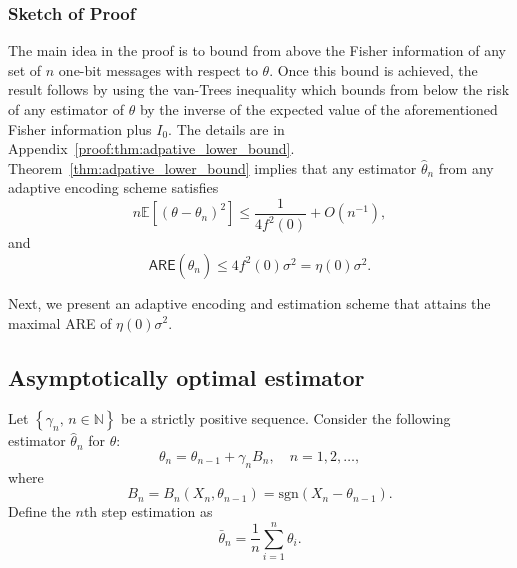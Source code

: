 \documentclass[letterpaper, 11pt]{IEEEtran}      %
\newcommand{\ARE}{\mathsf{ARE}}
\newcommand{\sgn}{\mathrm{sgn} }
\begin{document}
\subsubsection*{Sketch of Proof}
The main idea in the proof is to bound from above the Fisher information of any set of $n$ one-bit messages with respect to $\theta$. Once this bound is achieved, the result follows by using the van-Trees inequality which bounds from below the risk of any estimator of $\theta$ by the inverse of the expected value of the aforementioned Fisher information plus $I_0$. The details are in Appendix~\ref{proof:thm:adpative_lower_bound}.\\

Theorem~\ref{thm:adpative_lower_bound} implies that any estimator $\hat{\theta}_n$ from any adaptive encoding scheme satisfies
\[
n\mathbb E\left[ (\theta-\theta_n)^2 \right] \leq  \frac{1}{4f^2(0)}+O(n^{-1}),
\]
and 
\[
\ARE(\hat{\theta}_n) \leq 4f^2(0)\sigma^2 = \eta(0)\sigma^2.
\]

Next, we present an adaptive encoding and estimation scheme that attains the maximal ARE of $\eta(0)\sigma^2$. 

\subsection{Asymptotically optimal estimator}
Let $\left\{ \gamma_n,\, n\in \mathbb N \right\}$ be a strictly positive sequence. Consider the following estimator $\hat{\theta}_n$ for $\theta$:  
\begin{equation}
\label{eq:sgd_alg}
\theta_n = \theta_{n-1} +  \gamma_n B_n, \quad n = 1,2,\ldots,
\end{equation}
where 
\begin{equation}
B_n = B_n (X_n,\theta_{n-1}) =\sgn (X_n - \theta_{n-1}).
\end{equation}
Define the $n$th step estimation as
\begin{equation} \label{eq:sgd_est}
\bar{\theta}_n =  \frac{1}{n} \sum_{i=1}^n  \theta_i. 
\end{equation}
\end{document}
